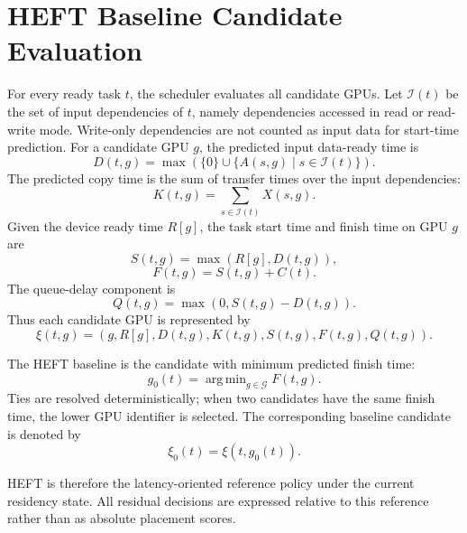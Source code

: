 \section{HEFT Baseline Candidate Evaluation}
\label{sec:methods-heft-baseline}

For every ready task $t$, the scheduler evaluates all candidate GPUs. Let $\mathcal{I}(t)$ be the set of input dependencies of $t$, namely dependencies accessed in read or read-write mode. Write-only dependencies are not counted as input data for start-time prediction. For a candidate GPU $g$, the predicted input data-ready time is
\begin{equation}
D(t,g)
=
\max
\left(
\{0\}\cup\{A(s,g)\mid s\in\mathcal{I}(t)\}
\right).
\end{equation}
The predicted copy time is the sum of transfer times over the input dependencies:
\begin{equation}
K(t,g)
=
\sum_{s\in\mathcal{I}(t)} X(s,g).
\end{equation}
Given the device ready time $R[g]$, the task start time and finish time on GPU $g$ are
\begin{equation}
S(t,g)=\max\left(R[g],D(t,g)\right),
\end{equation}
\begin{equation}
F(t,g)=S(t,g)+C(t).
\end{equation}
The queue-delay component is
\begin{equation}
Q(t,g)=\max\left(0,S(t,g)-D(t,g)\right).
\end{equation}
Thus each candidate GPU is represented by
\begin{equation}
\xi(t,g)
=
\left(g,R[g],D(t,g),K(t,g),S(t,g),F(t,g),Q(t,g)\right).
\end{equation}

The HEFT baseline is the candidate with minimum predicted finish time:
\begin{equation}
g_0(t)
=
\mathop{\mathrm{arg\,min}}_{g\in\mathcal{G}} F(t,g).
\end{equation}
Ties are resolved deterministically; when two candidates have the same finish time, the lower GPU identifier is selected. The corresponding baseline candidate is denoted by
\begin{equation}
\xi_0(t)=\xi(t,g_0(t)).
\end{equation}

HEFT is therefore the latency-oriented reference policy under the current residency state. All residual decisions are expressed relative to this reference rather than as absolute placement scores.

